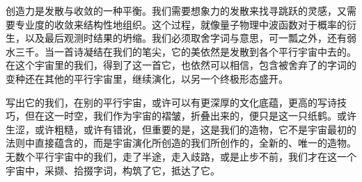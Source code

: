\documentclass{article}
\begin{document}
创造力是发散与收敛的一种平衡。我们需要想象力的发散来找寻跳跃的灵感，又需要专业度的收敛来结构性地组织。这个过程，就像量子物理中波函数对于概率的衍生，以及最后观测时结果的坍缩。我们必须取舍字词与意思，可一瓢之外，还有弱水三千。当一首诗凝结在我们的笔尖，它的美依然是发散到各个平行宇宙中去的。在这个宇宙里的我们，得到了这一首它，也依然可以相信，包含被舍弃了的字词的变种还在其他的平行宇宙里，继续演化，以另一个终极形态盛开。

写出它的我们，在别的平行宇宙，或许可以有更深厚的文化底蕴，更高的写诗技巧，但在这一时空，我们作为宇宙的褶皱，折叠出来的，便只是这一只纸鹤。或许生涩，或许粗糙，或许有错讹，但重要的是，这是我们的造物，它不是宇宙最初的法则中直接蕴含的，而是宇宙演化所创造的我们所创作的，全新的、唯一的造物。无数个平行宇宙中的我们，走了半途，走入歧路，或是止步不前，我们才在这一个宇宙中，采撷、拾掇字词，构筑了它，抵达了它。
\end{document}
